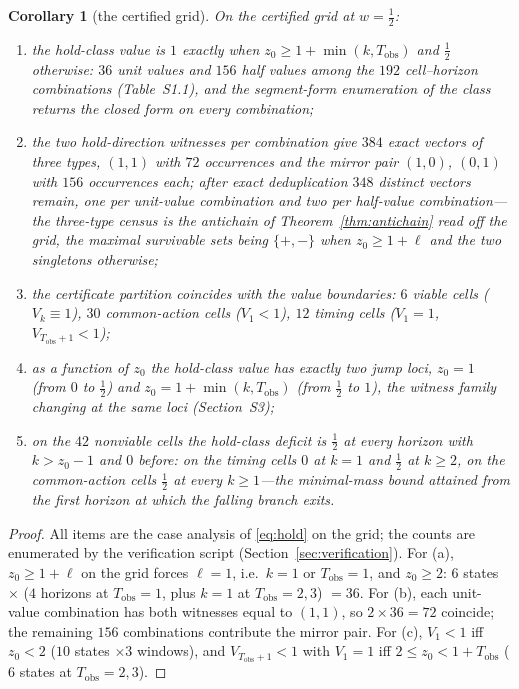 \documentclass[11pt,a4paper]{article}
\theoremstyle{plain}
\newtheorem{corollary}[theorem]{Corollary}
\theoremstyle{definition}
\theoremstyle{remark}
\newcommand{\Tobs}{T_{\mathrm{obs}}}
\newcommand{\tfr}[2]{\tfrac{#1}{#2}}
\begin{document}
\begin{corollary}[the certified grid]\label{cor:grid}
On the certified grid at $w=\tfr12$:
\begin{enumerate}[leftmargin=1.6em,itemsep=1pt]
\item[(a)] the hold-class value is $1$ exactly when $z_0\ge1+\min(k,\Tobs)$ and $\tfr12$ otherwise: $36$ unit values and $156$ half values among the $192$ cell--horizon combinations (Table~S1.1), and the segment-form enumeration of the class returns the closed form on every combination;
\item[(b)] the two hold-direction witnesses per combination give $384$ exact vectors of three types, $(1,1)$ with $72$ occurrences and the mirror pair $(1,0)$, $(0,1)$ with $156$ occurrences each; after exact deduplication $348$ distinct vectors remain, one per unit-value combination and two per half-value combination---the three-type census is the antichain of Theorem~\ref{thm:antichain} read off the grid, the maximal survivable sets being $\{+,-\}$ when $z_0\ge1+\ell$ and the two singletons otherwise;
\item[(c)] the certificate partition coincides with the value boundaries: $6$ viable cells ($V_k\equiv1$), $30$ common-action cells ($V_1<1$), $12$ timing cells ($V_1=1$, $V_{\Tobs+1}<1$);
\item[(d)] as a function of $z_0$ the hold-class value has exactly two jump loci, $z_0=1$ (from $0$ to $\tfr12$) and $z_0=1+\min(k,\Tobs)$ (from $\tfr12$ to $1$), the witness family changing at the same loci (Section~S3);
\item[(e)] on the $42$ nonviable cells the hold-class deficit is $\tfr12$ at every horizon with $k>z_0-1$ and $0$ before: on the timing cells $0$ at $k=1$ and $\tfr12$ at $k\ge2$, on the common-action cells $\tfr12$ at every $k\ge1$---the minimal-mass bound attained from the first horizon at which the falling branch exits.
\end{enumerate}
\end{corollary}

\begin{proof}
All items are the case analysis of \eqref{eq:hold} on the grid; the counts are enumerated by the verification script (Section~\ref{sec:verification}). For (a), $z_0\ge1+\ell$ on the grid forces $\ell=1$, i.e.\ $k=1$ or $\Tobs=1$, and $z_0\ge2$: $6$ states $\times$ ($4$ horizons at $\Tobs=1$, plus $k=1$ at $\Tobs=2,3$) $=36$. For (b), each unit-value combination has both witnesses equal to $(1,1)$, so $2\times36=72$ coincide; the remaining $156$ combinations contribute the mirror pair. For (c), $V_1<1$ iff $z_0<2$ ($10$ states $\times3$ windows), and $V_{\Tobs+1}<1$ with $V_1=1$ iff $2\le z_0<1+\Tobs$ ($6$ states at $\Tobs=2,3$).
\end{proof}
\end{document}
